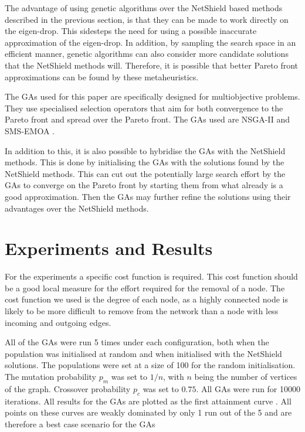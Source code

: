 \documentclass{svproc}
\begin{document}
The advantage of using genetic algorithms over the NetShield based methods described in the previous section, is that they can be made to work directly on the eigen-drop. This sidesteps the need for using a possible inaccurate approximation of the eigen-drop. In addition, by sampling the search space in an efficient manner, genetic algorithms can also consider more candidate solutions that the NetShield methods will. Therefore, it is possible that better Pareto front approximations can be found by these metaheuristics. 

The GAs used for this paper are specifically designed for multiobjective problems. They use specialised selection operators that aim for both convergence to the Pareto front and spread over the Pareto front. The GAs used are NSGA-II \cite{deb2002fast} and SMS-EMOA \cite{emmerich2005emo}.

In addition to this, it is also possible to hybridise the GAs with the NetShield methods. This is done by initialising the GAs with the solutions found by the NetShield methods. This can cut out the potentially large search effort by the GAs to converge on the Pareto front by starting them from what already is a good approximation. Then the GAs may further refine the solutions using their advantages over the NetShield methods.

\section{Experiments and Results}

For the experiments a specific cost function is required. This cost function should be a good local measure for the effort required for the removal of a node. The cost function we used is the degree of each node, as a highly connected node is likely to be more difficult to remove from the network than a node with less incoming and outgoing edges.

All of the GAs were run 5 times under each configuration, both when the population was initialised at random and when initialised with the NetShield solutions. The populations were set at a size of 100 for the random initialisation. The mutation probability $p_m$ was set to $1/n$, with $n$ being the number of vertices of the graph. Crossover probability $p_c$ was set to $0.75$. All GAs were run for 10000 iterations. All results for the GAs are plotted as the first attainment curve \cite{Fonseca96a}. All points on these curves are weakly dominated by only 1 run out of the 5 and are therefore a best case scenario for the GAs
\end{document}
